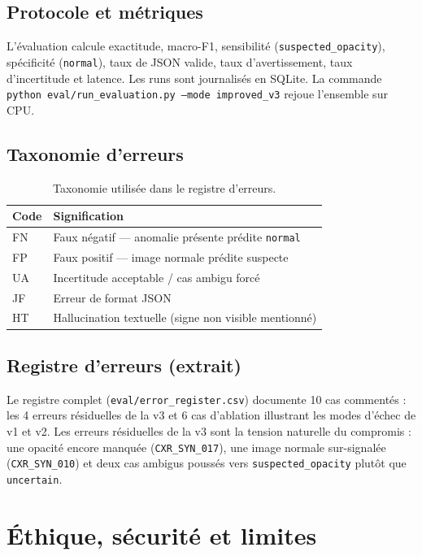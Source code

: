 \documentclass[11pt,a4paper]{article}
\begin{document}
\subsection{Protocole et métriques}
L'évaluation calcule exactitude, macro-F1, sensibilité (\texttt{suspected\_opacity}), spécificité
(\texttt{normal}), taux de JSON valide, taux d'avertissement, taux d'incertitude et latence. Les
runs sont journalisés en SQLite. La commande \texttt{python eval/run\_evaluation.py --mode
improved\_v3} rejoue l'ensemble sur CPU.

\subsection{Taxonomie d'erreurs}
\begin{table}[h]
\centering
\renewcommand{\arraystretch}{1.2}
\begin{tabular}{ll}
\toprule
\textbf{Code} & \textbf{Signification}\\
\midrule
FN & Faux négatif --- anomalie présente prédite \texttt{normal}\\
FP & Faux positif --- image normale prédite suspecte\\
UA & Incertitude acceptable / cas ambigu forcé\\
JF & Erreur de format JSON\\
HT & Hallucination textuelle (signe non visible mentionné)\\
\bottomrule
\end{tabular}
\caption{Taxonomie utilisée dans le registre d'erreurs.}
\end{table}

\subsection{Registre d'erreurs (extrait)}
Le registre complet (\texttt{eval/error\_register.csv}) documente 10 cas commentés : les 4 erreurs
résiduelles de la v3 et 6 cas d'ablation illustrant les modes d'échec de v1 et v2. Les erreurs
résiduelles de la v3 sont la tension naturelle du compromis : une opacité encore manquée
(\texttt{CXR\_SYN\_017}), une image normale sur-signalée (\texttt{CXR\_SYN\_010}) et deux cas
ambigus poussés vers \texttt{suspected\_opacity} plutôt que \texttt{uncertain}.

\section{Éthique, sécurité et limites}
\end{document}
